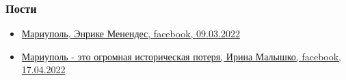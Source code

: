 
 
 
 
 

\subsubsection{Пости}


\begin{itemize} %

\item \hyperlink{09_03_2022.fb.menendes_enrike.1.mariupol}{%
Мариуполь, Энрике Менендес, facebook, 09.03.2022
}

\item \hyperlink{17_04_2022.fb.malyshko_irina.1.mariupol_muzej}{%
Мариуполь - это огромная историческая потеря, Ирина Малышко, facebook, 17.04.2022%
}

\end{itemize} %


